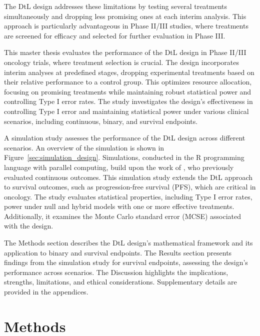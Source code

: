 \documentclass[11pt, a4paper]{article}\usepackage[]{graphicx}\usepackage[]{xcolor}
\begin{document}
The DtL design addresses these limitations by testing several treatments simultaneously and dropping less promising ones at each interim analysis. This approach is particularly advantageous in Phase II/III studies, where treatments are screened for efficacy and selected for further evaluation in Phase III.

This master thesis evaluates the performance of the DtL design in Phase II/III oncology trials, where treatment selection is crucial. The design incorporates interim analyses at predefined stages, dropping experimental treatments based on their relative performance to a control group. This optimizes resource allocation, focusing on promising treatments while maintaining robust statistical power and controlling Type I error rates. The study investigates the design's effectiveness in controlling Type I error and maintaining statistical power under various clinical scenarios, including continuous, binary, and survival endpoints.

A simulation study assesses the performance of the DtL design across different scenarios. An overview of the simulation is shown in Figure~\ref{sec:simulation_design}. Simulations, conducted in the R programming language with parallel computing, build upon the work of \cite{Wason2017DropTheLosers}, who previously evaluated continuous outcomes. This simulation study extends the DtL approach to survival outcomes, such as progression-free survival (PFS), which are critical in oncology. The study evaluates statistical properties, including Type I error rates, power under null and hybrid models with one or more effective treatments. Additionally, it examines the Monte Carlo standard error (MCSE) associated with the design.

The Methods section describes the DtL design's mathematical framework and its application to binary and survival endpoints. The Results section presents findings from the simulation study for survival endpoints, assessing the design's performance across scenarios. The Discussion highlights the implications, strengths, limitations, and ethical considerations. Supplementary details are provided in the appendices.

\newpage

\section{Methods} \label{sec:methods}
\end{document}
